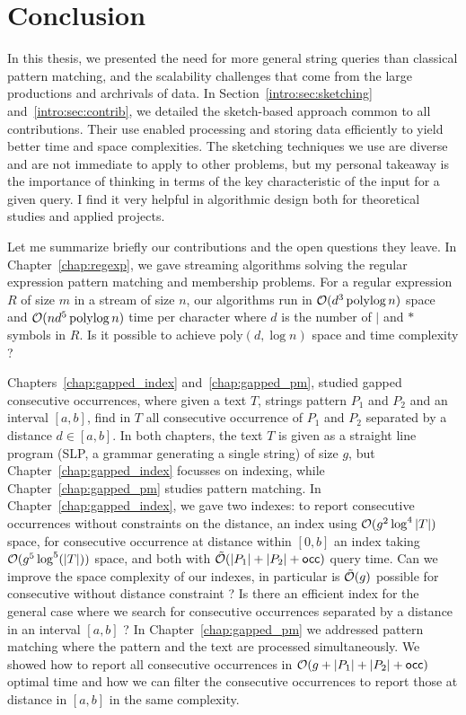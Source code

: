 \clearemptydoublepage
{}
\chapter*{Conclusion}
In this thesis, we presented the need for more general string queries than classical pattern matching, and the scalability challenges that come from the large productions and archrivals of data.
%
In Section~\ref*{intro:sec:sketching} and~\ref*{intro:sec:contrib}, we detailed the sketch-based approach common to all contributions. Their use enabled processing and storing data efficiently to yield better time and space complexities.
%
The sketching techniques we use are diverse and are not immediate to apply to other problems, but my personal takeaway is the importance of thinking in terms of the key characteristic of the input for a given query. I find it very helpful in algorithmic design both for theoretical studies and applied projects.


Let me summarize briefly our contributions and the open questions they leave. 
In Chapter~\ref{chap:regexp}, we gave streaming algorithms solving the regular expression pattern matching and membership problems. For a regular expression $R$ of size $m$ in a stream of size $n$, our algorithms run in $\mathcal{O}(d^3 \operatorname{polylog} n)$ space and $\mathcal{O}(nd^5\operatorname{polylog} n)$ time per character where $d$ is the number of $|$ and $\ast$ symbols in $R$. Is it possible to achieve $\mathrm{poly}(d,\log n)$ space and time complexity ?

Chapters~\ref{chap:gapped_index} and~\ref{chap:gapped_pm}, studied gapped consecutive occurrences, where given a text $T$, strings pattern $P_1$ and $P_2$ and an interval $[a,b]$, find in $T$ all consecutive occurrence of $P_1$ and $P_2$ separated by a distance $d \in [a,b]$. In both chapters, the text $T$ is given as a straight line program (SLP, a grammar generating a single string) of size $g$, but Chapter~\ref{chap:gapped_index} focusses on indexing, while Chapter~\ref{chap:gapped_pm} studies pattern matching. In Chapter~\ref{chap:gapped_index}, we gave two indexes: to report consecutive occurrences without constraints on the distance, an index using $\mathcal{O}(g^2\log^4|T|)$ space, for consecutive occurrence at distance within $[0,b]$ an index taking $\mathcal{O} (g^5\log^5(|T|))$ space, and both with $\tilde{\mathcal{O}}(|P_1|+|P_2|+\mathsf{occ})$ query time. 
%
Can we improve the space complexity of our indexes, in particular is $\tilde{\mathcal{O}}(g)$ possible for consecutive without distance constraint ? Is there an efficient index for the general case where we search for consecutive occurrences separated by a distance in an interval $[a,b]$ ?
%
In Chapter~\ref{chap:gapped_pm} we addressed pattern matching where the pattern and the text are processed simultaneously. We showed how to report all consecutive occurrences in $\mathcal{O}(g+|P_1|+|P_2|+\mathsf{occ})$ optimal time and how we can filter the consecutive occurrences to report those at distance in $[a,b]$ in the same complexity.


